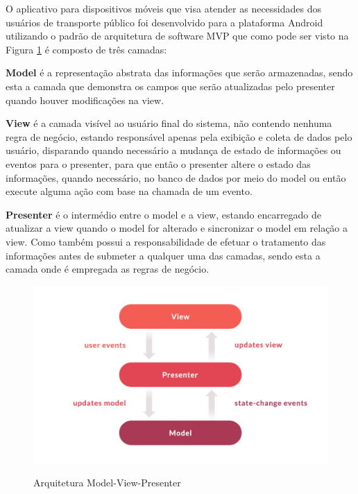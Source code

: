 {{{{O aplicativo para dispositivos móveis que visa atender as necessidades dos usuários de transporte público foi desenvolvido para a plataforma Android utilizando o padrão de arquitetura de software MVP que como pode ser visto na Figura \ref{fig:model-view-presenter} é composto de três camadas:

\begin{lista}
\item \textbf{Model} é a representação abstrata das informações que serão armazenadas, sendo esta a camada que demonstra os campos que serão atualizadas pelo presenter quando houver modificações na view.
\item \textbf{View} é a camada visível ao usuário final do sistema, não contendo nenhuma regra de negócio, estando responsável apenas pela exibição e coleta de dados pelo usuário, disparando quando necessário a mudança de estado de informações ou eventos para o presenter, para que então o presenter altere o estado das informações, quando necessário, no banco de dados por meio do model ou então execute alguma ação com base na chamada de um evento.
\item \textbf{Presenter} é o intermédio entre o model e a view, estando encarregado de atualizar a view quando o model for alterado e sincronizar o model em relação a view. Como também possui a responsabilidade de efetuar o tratamento das informações antes de submeter a qualquer uma das camadas, sendo esta a camada onde é empregada as regras de negócio.
\end{lista}

\begin{figure}[H]
\caption{Arquitetura Model-View-Presenter}
\centering
\includegraphics[width=1.0\textwidth]{imagens/model-view-presenter.png}
\label{fig:model-view-presenter}
\end{figure}

}}}}
